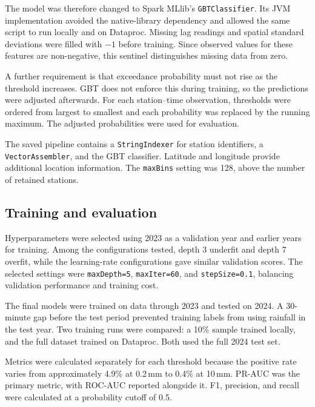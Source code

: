 \documentclass[11pt]{article}
\begin{document}
The model was therefore changed to Spark MLlib's \texttt{GBTClassifier}. Its JVM implementation avoided the native-library dependency and allowed the same script to run locally and on Dataproc. Missing lag readings and spatial standard deviations were filled with $-1$ before training. Since observed values for these features are non-negative, this sentinel distinguishes missing data from zero.

A further requirement is that exceedance probability must not rise as the threshold increases. GBT does not enforce this during training, so the predictions were adjusted afterwards. For each station--time observation, thresholds were ordered from largest to smallest and each probability was replaced by the running maximum. The adjusted probabilities were used for evaluation.

The saved pipeline contains a \texttt{StringIndexer} for station identifiers, a \texttt{VectorAssembler}, and the GBT classifier. Latitude and longitude provide additional location information. The \texttt{maxBins} setting was 128, above the number of retained stations.

\subsection{Training and evaluation}

Hyperparameters were selected using 2023 as a validation year and earlier years for training. Among the configurations tested, depth 3 underfit and depth 7 overfit, while the learning-rate configurations gave similar validation scores. The selected settings were \texttt{maxDepth=5}, \texttt{maxIter=60}, and \texttt{stepSize=0.1}, balancing validation performance and training cost.

The final models were trained on data through 2023 and tested on 2024. A 30-minute gap before the test period prevented training labels from using rainfall in the test year. Two training runs were compared: a 10\% sample trained locally, and the full dataset trained on Dataproc. Both used the full 2024 test set.

Metrics were calculated separately for each threshold because the positive rate varies from approximately 4.9\% at 0.2\,mm to 0.4\% at 10\,mm. PR-AUC was the primary metric, with ROC-AUC reported alongside it. F1, precision, and recall were calculated at a probability cutoff of 0.5.
\end{document}
